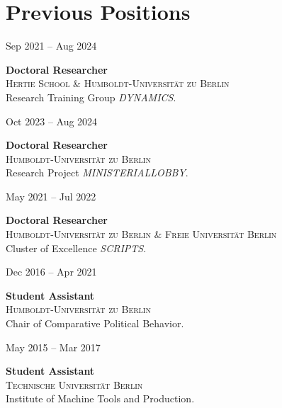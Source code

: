 \documentclass[11pt,a4paper]{article}
\newlength{\cvleftw}\setlength{\cvleftw}{0.20\textwidth}
\newlength{\cvrightw}\setlength{\cvrightw}{0.76\textwidth}
\newlength{\cvgap}\setlength{\cvgap}{0.02\textwidth}
\newenvironment{cventries}{\par\setlength{\parskip}{0pt}}{\par}
\newcommand{\cvitem}[2]{%
  \par\nopagebreak[2]%
  \noindent
  \begin{minipage}[t]{\cvleftw}\raggedright\color{cvmuted}\small\vspace{0pt}\strut #1\end{minipage}%
  \hspace{\cvgap}%
  \begin{minipage}[t]{\cvrightw}\raggedright\vspace{0pt}\strut #2\end{minipage}%
  \par\vspace{10pt plus 3pt minus 2pt}%
}
\newcommand{\cvtitle}[1]{\textbf{#1}}
\newcommand{\cvinst}[1]{\textsc{\small #1}}    %
\begin{document}
\section*{Previous Positions}
\begin{cventries}
\cvitem{Sep 2021 -- Aug 2024}{%
  \cvtitle{Doctoral Researcher} \\
  \cvinst{Hertie School \& Humboldt-Universit\"at zu Berlin} \\
  Research Training Group \emph{DYNAMICS}.}
\cvitem{Oct 2023 -- Aug 2024}{%
  \cvtitle{Doctoral Researcher} \\
  \cvinst{Humboldt-Universit\"at zu Berlin} \\
  Research Project \emph{MINISTERIALLOBBY}.}
\cvitem{May 2021 -- Jul 2022}{%
  \cvtitle{Doctoral Researcher} \\
  \cvinst{Humboldt-Universit\"at zu Berlin \& Freie Universit\"at Berlin} \\
  Cluster of Excellence \emph{SCRIPTS}.}
\cvitem{Dec 2016 -- Apr 2021}{%
  \cvtitle{Student Assistant} \\
  \cvinst{Humboldt-Universit\"at zu Berlin} \\
  Chair of Comparative Political Behavior.}
\cvitem{May 2015 -- Mar 2017}{%
  \cvtitle{Student Assistant} \\
  \cvinst{Technische Universit\"at Berlin} \\
  Institute of Machine Tools and Production.}
\end{cventries}

\end{document}
